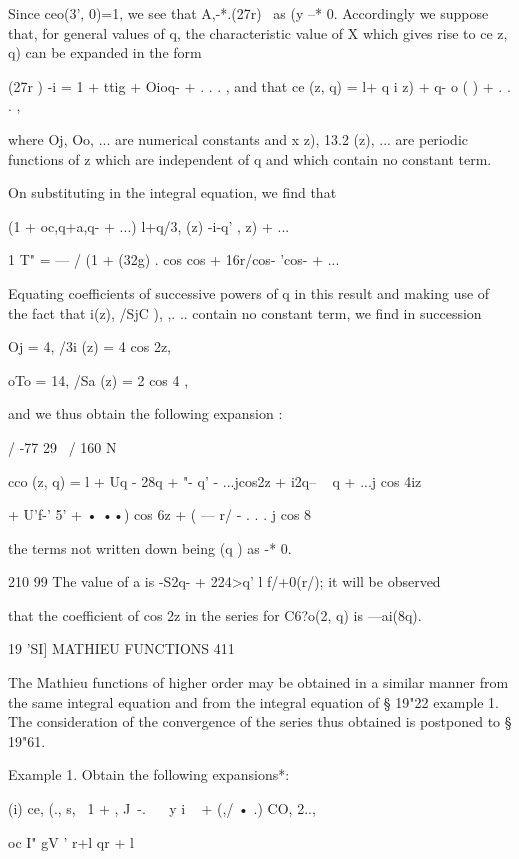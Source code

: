 Since ceo(3', 0)=1, we see that A,-*.(27r)~  as (y --* 0. Accordingly we 
suppose that, for general values of q, the characteristic value of X which gives 
rise to ce   z, q) can be expanded in the form 

(27r ) -i = 1 + ttig + Oioq- + . . . , 
and that ce  (z, q) = l+ q i  z) + q- o ( ) + . . . , 

where Oj, Oo, ... are numerical constants and  x z), 13.2 (z), ... are periodic 
functions of z which are independent of q and which contain no constant 
term. 

On substituting in the integral equation, we find that 

(1 + oc,q+a,q- + ...)  l+q/3, (z) -i-q' , z) + ...  

1 T" 
= — / (1 + \/(32g) . cos   cos   + 16r/cos- 'cos-  + ...  

Equating coefficients of successive powers of q in this result and making 
use of the fact that  i(z), /SjC ), ,. .. contain no constant term, we find in 
succession 

Oj = 4, /3i (z) = 4 cos 2z, 

oTo = 14, /Sa (z) = 2 cos 4 , 



and we thus obtain the following expansion : 

/ -77 29 \ / 160 N 

cco (z, q) = l + Uq - 28q  + "-  q' - ...jcos2z + i2q-- ~ q + ...j cos 4iz 

+ U'f-'  5' + • ••) cos 6z + ( — r/ - . . . j cos 8  

the terms not written down being (q ) as   -* 0. 

210 99 
The value of a is -S2q- + 224>q' l f/+0(r/); it will be observed 

that the coefficient of cos 2z in the series for C6?o(2, q) is —ai(8q). 



19 'SI] MATHIEU FUNCTIONS 411 

The Mathieu functions of higher order may be obtained in a similar 
manner from the same integral equation and from the integral equation of 
§ 19"22 example 1. The consideration of the convergence of the series thus 
obtained is postponed to § 19"61. 

Example 1. Obtain the following expansions*: 

(i) ce, (., s, \  1 +  , J\   -. ~   \ y  i  ~ + (,/  • .)  CO, 2.., 

oc I" gV ' r+l qr + l 

